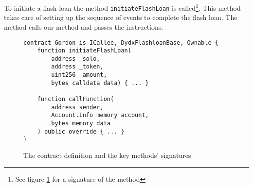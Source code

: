 \noindent To initiate a flash loan the method \verb|initiateFlashLoan| is
called\footnote{See figure \ref{signature} for a signature of the method}. This
method takes care of setting up the sequence of events to complete the flash
loan. The method calls our  method and passes the
instructions.

\begin{figure}[H]
\begin{lstlisting}[language=Solidity,numbers=none]
contract Gordon is ICallee, DydxFlashloanBase, Ownable {
    function initiateFlashLoan(
        address _solo,
        address _token,
        uint256 _amount,
        bytes calldata data) { ... }

    function callFunction(
        address sender,
        Account.Info memory account,
        bytes memory data
    ) public override { ... }
}
\end{lstlisting}
    \caption{The contract definition and the key methods' signatures}
    \label{signature}
\end{figure}
